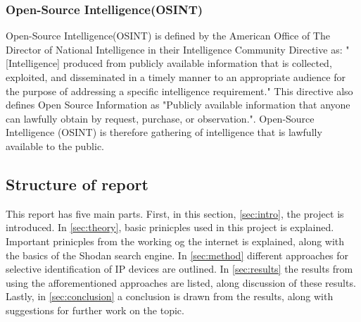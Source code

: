 \subsubsection{Open-Source Intelligence(OSINT)}\label{sec:osint}
Open-Source Intelligence(OSINT) is defined by the American Office of The Director of National Intelligence in their Intelligence Community Directive as: "[Intelligence] produced from publicly available information that is collected, exploited, and disseminated in a timely manner to an appropriate audience for the purpose of addressing a specific intelligence requirement."\cite{directive_301} This directive also defines Open Source Information as "Publicly available information that anyone can lawfully obtain by request, purchase, or observation.". Open-Source Intelligence (OSINT) is therefore gathering of intelligence that is lawfully available to the public. 

\subsection{Structure of report}
This report has five main parts. First, in this section, \cref{sec:intro}, the project is introduced. In \cref{sec:theory}, basic prinicples used in this project is explained. Important prinicples from the working og the internet is explained, along with the basics of the Shodan search engine. In \cref{sec:method} different approaches for selective identification of IP devices are outlined. In \cref{sec:results} the results from using the afforementioned approaches are listed, along discussion of these results. Lastly, in \cref{sec:conclusion} a conclusion is drawn from the results, along with suggestions for further work on the topic.

\newpage
